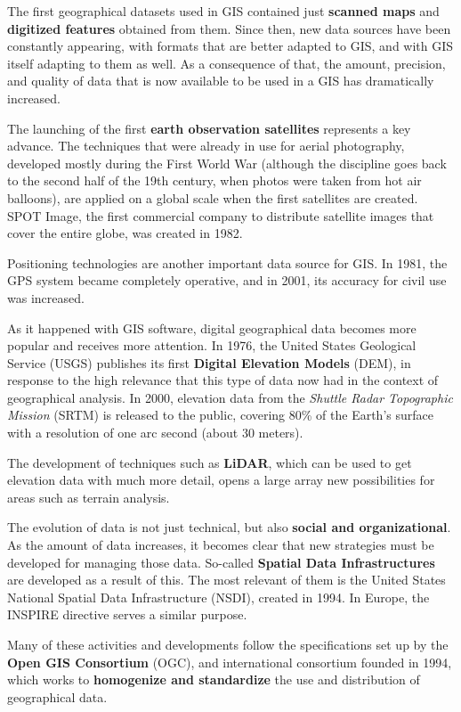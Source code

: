 The first geographical datasets used in GIS contained just \textbf{scanned maps} and \textbf{digitized features} obtained from them. Since then, new data sources have been constantly appearing, with formats that are better adapted to GIS, and with GIS itself adapting to them as well. As a consequence of that, the amount, precision, and quality of data that is now available to be used in a GIS has dramatically increased.

The launching of the first \textbf{earth observation satellites} represents a key advance. The techniques that were already in use for aerial photography, developed mostly during the First World War (although the discipline goes back to the second half of the 19th century, when photos were taken from hot air balloons), are applied on a global scale when the first satellites are created. SPOT Image, the first commercial company to distribute satellite images that cover the entire globe, was created in 1982.

Positioning technologies are another important data source for GIS. In 1981, the GPS system became completely operative, and in 2001, its accuracy for civil use was increased.

As it happened with GIS software, digital geographical data becomes more popular and receives more attention. In 1976, the United States Geological Service (USGS) publishes its first \textbf{Digital Elevation Models} (DEM), in response to the high relevance that this type of data now had in the context of geographical analysis. In 2000, elevation data from the \emph{Shuttle Radar Topographic Mission} (SRTM) is released to the public, covering 80\% of the Earth's surface with a resolution of one arc second (about 30 meters).

The development of techniques such as \textbf{LiDAR}, which can be used to get elevation data with much more detail, opens a large array new possibilities for areas such as terrain analysis.

The evolution of data is not just technical, but also \textbf{social and organizational}. As the amount of data increases, it becomes clear that new strategies must be developed for managing those data. So-called \textbf{Spatial Data Infrastructures} are developed as a result of this. The most relevant of them is the United States National Spatial Data Infrastructure (NSDI), created in 1994. In Europe, the INSPIRE directive serves a similar purpose.

Many of these activities and developments follow the specifications set up by the \textbf{Open GIS Consortium} (OGC), and international consortium founded in 1994, which works to \textbf{homogenize and standardize} the use and distribution of geographical data.

